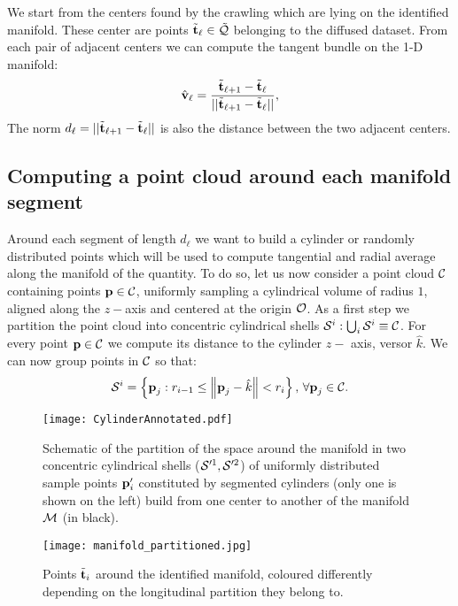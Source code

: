 We start from the centers found by the crawling which are lying on the identified manifold. These center are points $\tilde{\boldsymbol{\mathbf{t}}}_{\ell} \in \tilde{\mathcal{Q}}$ belonging to the diffused dataset.
From each pair of adjacent centers we can compute the tangent bundle on the 1-D manifold:
\begin{equation}
  \hat{\boldsymbol{\mathbf{v}}}_{\ell} =  \frac{\tilde{\boldsymbol{\mathbf{t}}}_{\ell + 1} - \tilde{\boldsymbol{\mathbf{t}}}_{\ell}}{|| \tilde{\boldsymbol{\mathbf{t}}}_{\ell + 1} - \tilde{\boldsymbol{\mathbf{t}}}_{\ell}||},
\end{equation}
The norm $d_{\ell} = || \tilde{\boldsymbol{\mathbf{t}}}_{\ell + 1} - \tilde{\boldsymbol{\mathbf{t}}}_{\ell}||$ is also the distance between the two adjacent centers.

\subsection{Computing a point cloud around each manifold segment}
Around each segment of length $d_{\ell}$ we want to build a cylinder or randomly distributed points which will be used to compute tangential and radial average along the manifold of the quantity.
To do so, let us now consider a point cloud $\mathcal{C}$ containing points $\boldsymbol{\mathbf{p}} \in \mathcal{C}$, uniformly sampling a cylindrical volume of radius $1$, aligned along the $z-$axis and centered at the origin $\mathcal{O}$.
As a first step we partition the point cloud into concentric cylindrical shells $\mathcal{S}^i: \bigcup_i \mathcal{S}^i \equiv \mathcal{C}$.
For every point $\boldsymbol{\mathbf{p}} \in \mathcal{C}$ we compute its distance to the cylinder $z-$ axis, versor $\hat k$.
We can now group points in $\mathcal{C}$ so that:
\begin{equation}
  \mathcal{S}^i =
  \left\{ \boldsymbol{\mathbf{p}}_j:  r_{i-1} \leq \norm{\boldsymbol{\mathbf{p}}_j-\hat{k}} < r_i \right\},\, \forall \boldsymbol{\mathbf{p}}_j \in \mathcal{C}.
\end{equation}

\begin{figure}
  \centering
  \texttt{[image: CylinderAnnotated.pdf]}
  \caption{Schematic of the partition of the space around the manifold in two concentric cylindrical shells ($\mathcal{S}'^1, \mathcal{S}'^2$) of uniformly distributed sample points $\boldsymbol{\mathbf{p}}'_i$ constituted by segmented cylinders (only one is shown on the left) build from one center to another of the manifold $\mathcal{M}$ (in black).}
  \label{fig:cylinder}
\end{figure}

\begin{figure}
  \centering
  \texttt{[image: manifold\_partitioned.jpg]}
  \caption{Points $\tilde{\boldsymbol{\mathbf{t}}}_i$ around the identified manifold, coloured differently depending on the longitudinal partition they belong to.}
  \label{fig:segmented_manifold}
\end{figure}

